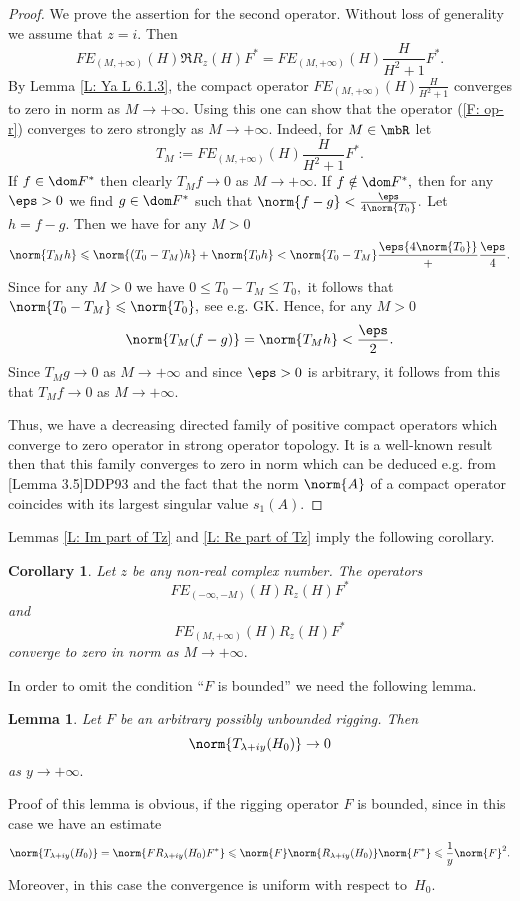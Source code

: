 \documentclass[11pt]{amsart}
\newtheorem{lemma}[thm]{Lemma}
\newtheorem{cor}[thm]{Corollary}
\let\leq\leqslant
\numberwithin{equation}{section}
\begin{document}
\begin{proof} We prove the assertion for the second operator.
Without loss of generality we assume that $z = i.$ Then
\begin{equation} \label{F: op-r}
  FE_{(M,+\infty)}(H) \Re R_z(H) F^* = FE_{(M,+\infty)}(H) \frac{H}{H^2+1}F^*.
\end{equation}
By Lemma \ref{L: Ya L 6.1.3}, the compact operator $FE_{(M,+\infty)}(H) \frac{H}{H^2+1}$ converges to zero in norm as $M \to +\infty.$
Using this one can show that the operator (\ref{F: op-r}) converges to zero strongly as $M \to +\infty.$
Indeed, for $M \in \mbR$ let
$$
  T_M:= FE_{(M,+\infty)}(H) \frac{H}{H^2+1}F^*.
$$
If $f \in \dom F^*$ then clearly $T_M f \to 0$ as $M \to +\infty.$ If $f \notin \dom F^*,$ then for any $\eps>0$ we find $g \in \dom F^*$
such that $\norm{f - g} < \frac{\eps}{4\norm{T_0}}.$ Let $h = f-g.$ Then we have for any $M>0$
$$
  \norm{T_M h} \leq \norm{(T_0-T_M) h} + \norm{T_0 h} < \norm{T_0-T_M} \frac \eps {4\norm{T_0}} + \frac \eps 4.
$$
Since for any $M>0$ we have $0 \leq T_0-T_M \leq T_{0},$ it follows that $\norm{T_0-T_M} \leq \norm{T_0},$ see e.g. {\futurelet\NChar\CleverCite}{GK}.
Hence, for any $M>0$
$$
  \norm{T_M (f-g)} = \norm{T_M h} < \frac \eps 2.
$$
Since $T_M g \to 0$ as $M \to +\infty$ and since $\eps>0$ is arbitrary, it follows from this that $T_M f \to 0$ as $M \to +\infty.$

Thus, we have a decreasing directed family of positive compact operators which converge to zero operator in strong operator topology.
It is a well-known result then that this family converges to zero in norm which can be deduced e.g. from {\futurelet\NChar\CleverCite}[Lemma 3.5]{DDP93}
and the fact that the norm $\norm{A}$ of a compact operator coincides with its largest singular value $s_1(A).$
\end{proof}

Lemmas \ref{L: Im part of Tz} and \ref{L: Re part of Tz} imply the following corollary.
\begin{cor} \label{C: full Tz}
Let $z$ be any non-real complex number.
The operators
$$
  FE_{(-\infty,-M)}(H) R_z(H) F^*
$$
and
$$
  FE_{(M,+\infty)}(H) R_z(H) F^*
$$
converge to zero in norm as $M \to +\infty.$
\end{cor}

In order to omit the condition ``$F$ is bounded'' we need the following lemma.
\begin{lemma} \label{L: On limit of T(z) as y to infty} Let $F$ be an arbitrary possibly unbounded rigging. Then
$$
  \norm{T_{\lambda+iy}(H_0)} \to 0
$$
as $y \to +\infty.$
\end{lemma}
Proof of this lemma is obvious, if the rigging operator $F$ is
bounded, since in this case we have an estimate
$$
  \norm{T_{\lambda+iy}(H_0)} = \norm{FR_{\lambda+iy}(H_0)F^*} \leq \norm{F} \norm{R_{\lambda+iy}(H_0)} \norm{F^*} \leq \frac 1y \norm{F}^2.
$$
Moreover, in this case the convergence is uniform with respect to~$H_0.$
\end{document}
